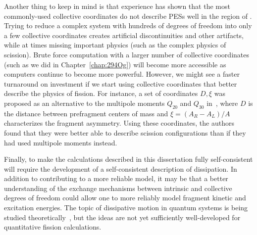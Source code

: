 Another thing to keep in mind is that experience has shown that the most commonly-used collective coordinates do not describe PESs well in the region of {\Pt}. Trying to reduce a complex system with hundreds of degrees of freedom into only a few collective coordinates creates artificial discontinuities and other artifacts, while at times missing important physics (such as the complex physics of scission). Brute force computation with a larger number of collective coordinates (such as we did in Chapter~\ref{chap:294Og}) will become more accessible as computers continue to become more powerful. However, we might see a faster turnaround on investment if we start using collective coordinates that better describe the physics of fission. For instance, a set of coordinates $D, \xi$ was proposed as an alternative to the multipole moments $Q_{20}$ and $Q_{30}$ in~\cite{Younes2012}, where $D$ is the distance between prefragment centers of mass and $\xi = (A_R-A_L)/A$ characterizes the fragment asymmetry. Using these coordinates, the authors found that they were better able to describe scission configurations than if they had used multipole moments instead. %


Finally, to make the calculations described in this dissertation fully self-consistent will require the development of a self-consistent description of dissipation. In addition to contributing to a more reliable model, it may be that a better understanding of the exchange mechanisms between intrinsic and collective degrees of freedom could allow one to more reliably model fragment kinetic and excitation energies. The topic of dissipative motion in quantum systems is being studied theoretically~\cite{Koch2008, Lacroix2008, Hupin2010, Sargsyan2010}, but the ideas are not yet sufficiently well-developed for quantitative fission calculations.


